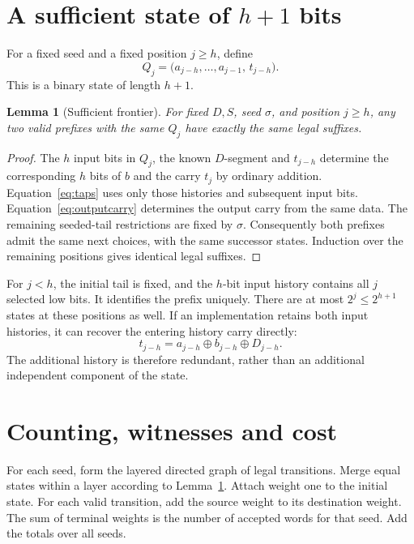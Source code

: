 \documentclass[11pt,a4paper]{article}
\newtheorem{lemma}[theorem]{Lemma}
\theoremstyle{definition}\newtheorem{definition}[theorem]{Definition}
\begin{document}
\section{A sufficient state of \texorpdfstring{$h+1$}{h+1} bits}
For a fixed seed and a fixed position $j\geq h$, define
\begin{equation}\label{eq:state}
 Q_j=\bigl(a_{j-h},\ldots,a_{j-1},\,t_{j-h}\bigr).
\end{equation}
This is a binary state of length $h+1$.

\begin{lemma}[Sufficient frontier]\label{lem:frontier}
For fixed $D,S$, seed $\sigma$, and position $j\geq h$, any two valid prefixes
with the same $Q_j$ have exactly the same legal suffixes.
\end{lemma}
\begin{proof}
The $h$ input bits in $Q_j$, the known $D$-segment and $t_{j-h}$ determine the
corresponding $h$ bits of $b$ and the carry $t_j$ by ordinary addition.
Equation~\eqref{eq:taps} uses only those histories and subsequent input bits.
Equation~\eqref{eq:outputcarry} determines the output carry from the same data.
The remaining seeded-tail restrictions are fixed by $\sigma$.
Consequently both prefixes admit the same next choices, with the same successor
states. Induction over the remaining positions gives identical legal suffixes.
\end{proof}

For $j<h$, the initial tail is fixed, and the $h$-bit input history contains
all $j$ selected low bits. It identifies the prefix uniquely.
There are at most $2^j\leq2^{h+1}$ states at these positions as well.
If an implementation retains both input histories, it can recover the entering
history carry directly:
\begin{equation}\label{eq:oldcarry}
 t_{j-h}=a_{j-h}\oplus b_{j-h}\oplus D_{j-h}.
\end{equation}
The additional history is therefore redundant, rather than an additional
independent component of the state.

\section{Counting, witnesses and cost}
For each seed, form the layered directed graph of legal transitions.
Merge equal states within a layer according to Lemma~\ref{lem:frontier}.
Attach weight one to the initial state. For each valid transition, add the
source weight to its destination weight. The sum of terminal weights is the
number of accepted words for that seed. Add the totals over all seeds.
\end{document}

